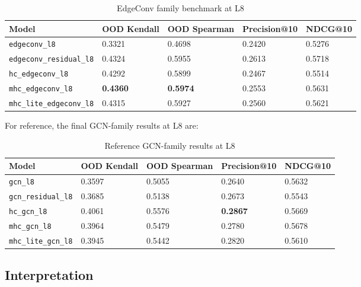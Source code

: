\documentclass[11pt,a4paper]{article}
\begin{document}
\begin{table}[h]
\centering
\caption{EdgeConv family benchmark at L8}
\begin{tabular}{L{4cm} R{2cm} R{2cm} R{2cm} R{2cm}}
\toprule
Model & OOD Kendall & OOD Spearman & Precision@10 & NDCG@10 \\
\midrule
\texttt{edgeconv\_l8}           & 0.3321 & 0.4698 & 0.2420 & 0.5276 \\
\texttt{edgeconv\_residual\_l8} & 0.4324 & 0.5955 & 0.2613 & 0.5718 \\
\texttt{hc\_edgeconv\_l8}       & 0.4292 & 0.5899 & 0.2467 & 0.5514 \\
\texttt{mhc\_edgeconv\_l8}      & \textbf{0.4360} & \textbf{0.5974} & 0.2553 & 0.5631 \\
\texttt{mhc\_lite\_edgeconv\_l8}& 0.4315 & 0.5927 & 0.2560 & 0.5621 \\
\bottomrule
\end{tabular}
\end{table}

For reference, the final GCN-family results at L8 are:

\begin{table}[h]
\centering
\caption{Reference GCN-family results at L8}
\begin{tabular}{L{4cm} R{2cm} R{2cm} R{2cm} R{2cm}}
\toprule
Model & OOD Kendall & OOD Spearman & Precision@10 & NDCG@10 \\
\midrule
\texttt{gcn\_l8}                & 0.3597 & 0.5055 & 0.2640 & 0.5632 \\
\texttt{gcn\_residual\_l8}      & 0.3685 & 0.5138 & 0.2673 & 0.5543 \\
\texttt{hc\_gcn\_l8}            & 0.4061 & 0.5576 & \textbf{0.2867} & 0.5669 \\
\texttt{mhc\_gcn\_l8}           & 0.3964 & 0.5479 & 0.2780 & 0.5678 \\
\texttt{mhc\_lite\_gcn\_l8}     & 0.3945 & 0.5442 & 0.2820 & 0.5610 \\
\bottomrule
\end{tabular}
\end{table}

\subsection{Interpretation}
\end{document}
